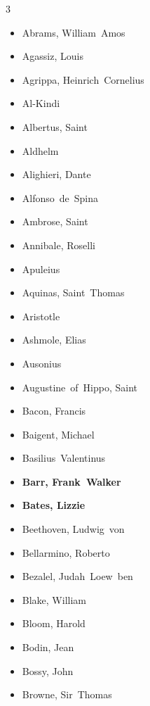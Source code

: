 \documentclass[10pt,makeidx]{extreport}
\begin{document}
\begin{multicols}{3}
	\begin{itemize}
		\item Abrams, William~Amos
		\item Agassiz, Louis
		\item Agrippa, Heinrich~Cornelius
		\item Al-Kindi
		\item Albertus, Saint
		\item Aldhelm
		\item Alighieri, Dante
		\item Alfonso~de~Spina
		\item Ambrose, Saint
		\item Annibale, Roselli
		\item Apuleius
		\item Aquinas, Saint~Thomas
		\item Aristotle
		\item Ashmole, Elias
		\item Ausonius
		\item Augustine~of~Hippo, Saint
		\item Bacon, Francis
		\item Baigent, Michael
		\item Basilius~Valentinus
		\item \textbf{Barr, Frank~Walker}
		\item \textbf{Bates, Lizzie}
		\item Beethoven, Ludwig~von
		\item Bellarmino, Roberto
		\item Bezalel, Judah~Loew~ben
		\item Blake, William
		\item Bloom, Harold
		\item Bodin, Jean
		\item Bossy, John
		\item Browne, Sir~Thomas

\end{itemize}
\end{multicols}
\end{document}
